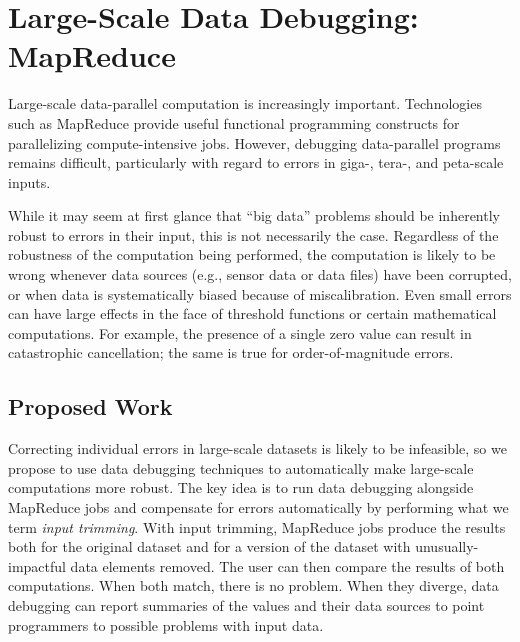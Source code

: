 \section{Large-Scale Data Debugging: MapReduce}
\label{sec:mapreduce}

Large-scale data-parallel computation is increasingly important.
Technologies such as MapReduce provide useful functional programming
constructs for parallelizing compute-intensive jobs.  However,
debugging data-parallel programs remains difficult, particularly with
regard to errors in giga-, tera-, and peta-scale inputs. 

While it may seem at first glance that ``big data'' problems should be
inherently robust to errors in their input, this is not necessarily
the case. Regardless of the robustness of the computation being
performed, the computation is likely to be wrong whenever data sources
(e.g., sensor data or data files) have been corrupted, or when data is
systematically biased because of miscalibration. Even small errors can
have large effects in the face of threshold functions or certain
mathematical computations. For example, the presence of a single zero
value can result in catastrophic cancellation; the same is true for
order-of-magnitude errors.

\subsection{Proposed Work}

Correcting individual errors in large-scale datasets is likely
to be infeasible, so we propose to use data debugging techniques to
automatically make large-scale computations more robust. The key idea
is to run data debugging alongside MapReduce jobs and compensate for
errors automatically by performing what we term \emph{input
  trimming}. With input trimming, MapReduce jobs produce the results
both for the original dataset and for a version of the dataset with
unusually-impactful data elements removed. The user can then compare
the results of both computations. When both match, there is no
problem. When they diverge, data debugging can report summaries of the
values and their data sources to point programmers to possible
problems with input data.


